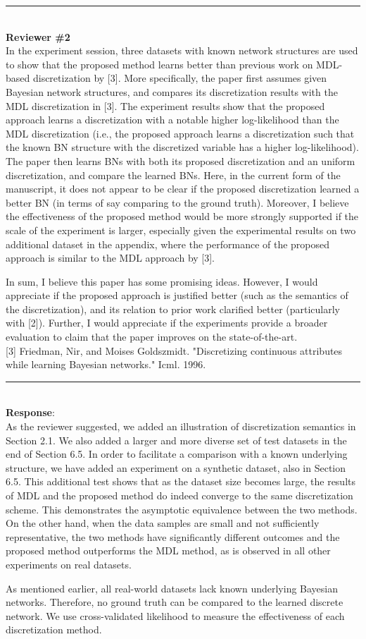 \documentclass{article}
\begin{document}
\noindent\rule{8cm}{0.4pt}\\
{\bf Reviewer \#2} \\

In the experiment session, three datasets with known network structures are used to show that the proposed method learns better than previous work on MDL-based discretization by [3]. More specifically, the paper first assumes given Bayesian network structures, and compares its discretization results with the MDL discretization in [3]. The experiment results show that the proposed approach learns a discretization with a notable higher log-likelihood than the MDL discretization (i.e., the proposed approach learns a discretization such that the known BN structure with the discretized variable has a higher log-likelihood). The paper then learns BNs with both its proposed discretization and an uniform discretization, and compare the learned BNs. Here, in the current form of the manuscript, it does not appear to be clear if the proposed discretization learned a better BN (in terms of say comparing to the ground truth). Moreover, I believe the effectiveness of the proposed method would be more strongly supported if the scale of the experiment is larger, especially given the experimental results on two additional dataset in the appendix, where the performance of the proposed approach is similar to the MDL approach by [3].

In sum, I believe this paper has some promising ideas. However, I would appreciate if the proposed approach is justified better (such as the semantics of the discretization), and its relation to prior work clarified better (particularly with [2]). Further, I would appreciate if the experiments provide a broader evaluation to claim that the paper improves on the state-of-the-art.\\

[3] Friedman, Nir, and Moises Goldszmidt. "Discretizing continuous attributes while learning Bayesian networks." Icml. 1996.

\noindent\rule{8cm}{0.4pt}\\
{\bf Response}:\\

As the reviewer suggested, we added an illustration of discretization semantics in Section 2.1.
We also added a larger and more diverse set of test datasets in the end of Section 6.5.
In order to facilitate a comparison with a known underlying structure, we have added an experiment on a synthetic dataset, also in Section 6.5.
This additional test shows that as the dataset size becomes large, the results of MDL and the proposed method do indeed converge to the same discretization scheme.
This demonstrates the asymptotic equivalence between the two methods.
On the other hand, when the data samples are small and not sufficiently representative, the two methods have significantly different outcomes and the proposed method outperforms the MDL method, as is observed in all other experiments on real datasets.

As mentioned earlier, all real-world datasets lack known underlying Bayesian networks. Therefore, no ground truth can be compared to the learned discrete network. We use cross-validated likelihood to measure the effectiveness of each discretization method.
\end{document}
